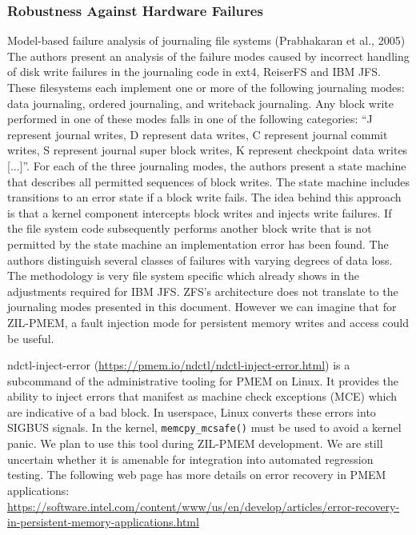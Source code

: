 \documentclass[12pt,a4paper,twoside,draft]{book}
\begin{document}
\subsubsection{ Robustness Against Hardware Failures}
Model-based failure analysis of journaling file systems (Prabhakaran et al., 2005)
The authors present an analysis of the failure modes caused by incorrect handling of disk write failures in the journaling code in ext4, ReiserFS and IBM JFS.
These filesystems each implement one or more of the following journaling modes: data journaling, ordered journaling, and writeback journaling.
Any block write performed in one of these modes falls in one of the following categories:
  “J represent journal writes, D represent data writes, C represent journal commit writes, S represent journal super block writes, K represent checkpoint data writes [...]”.
For each of the three journaling modes, the authors present a state machine that describes all permitted sequences of block writes.
The state machine includes transitions to an error state if a block write fails.
The idea behind this approach is that a kernel component intercepts block writes and injects write failures.
If the file system code subsequently performs another block write that is not permitted by the state machine an implementation error has been found.
The authors distinguish several classes of failures with varying degrees of data loss.
The methodology is very file system specific which already shows in the adjustments required for IBM JFS.
ZFS’s architecture does not translate to the journaling modes presented in this document.
However we can imagine that for ZIL-PMEM, a fault injection mode for persistent memory writes and access could be useful.

ndctl-inject-error (\url{https://pmem.io/ndctl/ndctl-inject-error.html}) is a subcommand of the administrative tooling for PMEM on Linux.
It provides the ability to inject errors that manifest as machine check exceptions (MCE) which are indicative of a bad block.
In userspace, Linux converts these errors into SIGBUS signals.
In the kernel, \lstinline{memcpy_mcsafe()} must be used to avoid a kernel panic.
We plan to use this tool during ZIL-PMEM development.
We are still uncertain whether it is amenable for integration into automated regression testing.
The following web page has more details on error recovery in PMEM applications: \url{https://software.intel.com/content/www/us/en/develop/articles/error-recovery-in-persistent-memory-applications.html}
\end{document}
